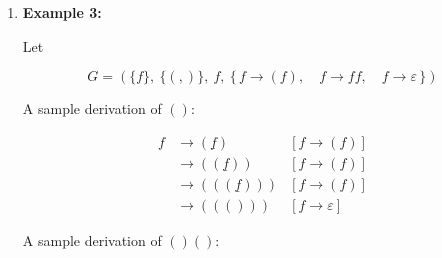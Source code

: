 \documentclass[12pt,a4paper,openany]{article}
\begin{document}
\begin{enumerate}
\vspace{1em}

\noindent
\begin{minipage}[t]{0.48\textwidth}
\[
\begin{aligned}
f &\to 0\underline{g}1 & [\text{by } f\to 0g1] \\
              &\to 0\underline{0g1}1 & [\text{by } g\to 0g1] \\
              &\to 00\underline{g}11 & [\text{by } g\to\varepsilon] \\
              &= 0011
\end{aligned}
\]
\end{minipage}
\hfill
\begin{minipage}[t]{0.48\textwidth}
\[
\begin{aligned}
f &\to 0\underline{g}1 & [\text{by } f\to 0g1] \\
              &\to 0\underline{0g1}1 & [\text{by } g\to 0g1] \\
              &\to 00\underline{0g1}11 & [\text{by } g\to 0g1] \\
              &\to 0000\underline{g}1111 & [\text{by } g\to\varepsilon] \\
              &= 00001111
\end{aligned}
\]
\end{minipage}

This grammar generates

\[
\boxed{L(G)=\{0^n 1^n \mid n\ge 1\}}.
\]

Note that the grammar defines how to produce strings; the language is the complete set of strings producible from that grammar.

\item \textbf{Example 3:}


Let

\[
G = (\{f\},\ \{(,)\},\ f,\ \{\, f \to (f),\quad f \to ff,\quad f \to \varepsilon \,\})
\]

A sample derivation of \(()\):

\[
\begin{aligned}
f &\to (\underline{f})     & [f \to (f)] \\
              &\to ((\underline{f}))   & [f \to (f)] \\
              &\to (((\underline{f}))) & [f \to (f)] \\
              &\to ((()))              & [f \to \varepsilon]
\end{aligned}
\]

A sample derivation of \(()()\):


\end{enumerate}
\end{document}
